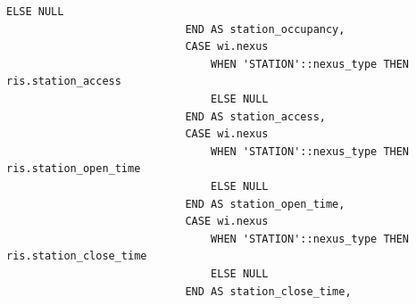 \begin{lstlisting}[label=lst:get_route_json_by_id:3,caption=Реализация функции получения маршрута (часть 3),firstnumber=90]
                                ELSE NULL
                            END AS station_occupancy,
                            CASE wi.nexus
                                WHEN 'STATION'::nexus_type THEN ris.station_access
                                ELSE NULL
                            END AS station_access,
                            CASE wi.nexus
                                WHEN 'STATION'::nexus_type THEN ris.station_open_time
                                ELSE NULL
                            END AS station_open_time,
                            CASE wi.nexus
                                WHEN 'STATION'::nexus_type THEN ris.station_close_time
                                ELSE NULL
                            END AS station_close_time,
\end{lstlisting}

\clearpage

